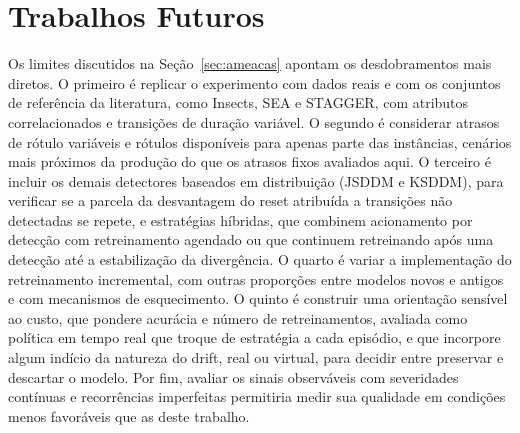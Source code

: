 \section{Trabalhos Futuros}

Os limites discutidos na Seção~\ref{sec:ameacas} apontam os desdobramentos
mais diretos. O primeiro é replicar o experimento com dados reais e com os
conjuntos de referência da literatura, como Insects, SEA e STAGGER, com
atributos correlacionados e transições de duração variável. O segundo é
considerar atrasos de rótulo variáveis e rótulos disponíveis para apenas
parte das instâncias, cenários mais próximos da produção do que os atrasos
fixos avaliados aqui. O terceiro é incluir os demais detectores baseados em
distribuição (JSDDM e KSDDM), para verificar se a parcela da desvantagem do
reset atribuída a transições não detectadas se repete, e estratégias
híbridas, que combinem
acionamento por detecção com retreinamento agendado ou que continuem
retreinando após uma detecção até a estabilização da divergência. O quarto é variar a implementação do retreinamento
incremental, com outras proporções entre modelos novos e antigos e com
mecanismos de esquecimento. O quinto é construir uma orientação sensível ao
custo, que pondere acurácia e número de
retreinamentos, avaliada como política em tempo real que troque de
estratégia a cada episódio, e que incorpore algum indício da natureza do
drift, real ou virtual, para decidir entre preservar e descartar o modelo.
Por fim, avaliar os sinais observáveis com severidades contínuas e
recorrências imperfeitas permitiria medir sua qualidade em condições menos
favoráveis que as deste trabalho.
